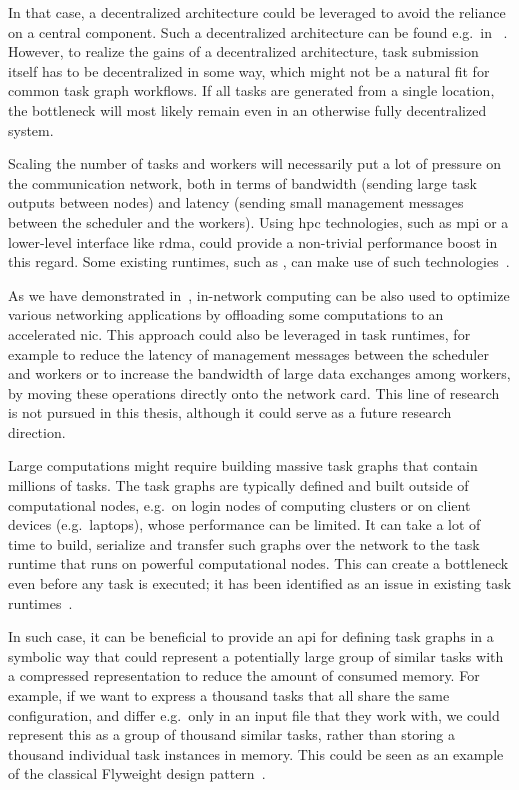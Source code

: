 \begin{description}[wide=0pt]
		In that case, a decentralized architecture could be leveraged to avoid the reliance on a central
		component. Such a decentralized architecture can be found e.g.\ in
		\ray{}~\cite{ray}. However, to realize the gains of a decentralized
		architecture, task submission itself has to be decentralized in some way, which might not be a
		natural fit for common task graph workflows. If all tasks are generated from a single location, the
		bottleneck will most likely remain even in an otherwise fully decentralized system.
	\item[Communication overhead] Scaling the number of tasks and workers will necessarily put a lot of pressure on the communication
		network, both in terms of bandwidth (sending large task outputs between nodes) and latency (sending
		small management messages between the scheduler and the workers). Using \gls{hpc}
		technologies, such as \gls{mpi} or a lower-level interface like
		\gls{rdma}, could provide a non-trivial performance boost in this regard. Some existing
		runtimes, such as \dask{}, can make use of such technologies~\cite{dask-ucx}.

		As we have demonstrated in~\cite{pspin, spin2}, in-network computing can be also used to
		optimize various networking applications by offloading some computations to an accelerated
		\gls{nic}. This approach could also be leveraged in task runtimes, for example to
		reduce the latency of management messages between the scheduler and workers or to increase the
		bandwidth of large data exchanges among workers, by moving these operations directly onto the
		network card. This line of research is not pursued in this thesis, although it could serve as a
		future research direction.
	\item[Task graph materialization] Large computations might require building massive task graphs that contain millions of tasks. The
		task graphs are typically defined and built outside of computational nodes, e.g.\ on login nodes of
		computing clusters or on client devices (e.g.\ laptops), whose performance can be limited. It can
		take a lot of time to build, serialize and transfer such graphs over the network to the task
		runtime that runs on powerful computational nodes. This can create a bottleneck even before any
		task is executed; it has been identified as an issue in existing task
		runtimes~\cite{dask-client-perf}.

		In such case, it can be beneficial to provide an \gls{api} for defining task graphs in
		a symbolic way that could represent a potentially large group of similar tasks with a compressed
		representation to reduce the amount of consumed memory. For example, if we want to express a
		thousand tasks that all share the same configuration, and differ e.g.\ only in an input file that
		they work with, we could represent this as a group of thousand similar tasks, rather than storing a
		thousand individual task instances in memory. This could be seen as an example of the classical
		Flyweight design pattern~\cite{gof}.


\end{description}
